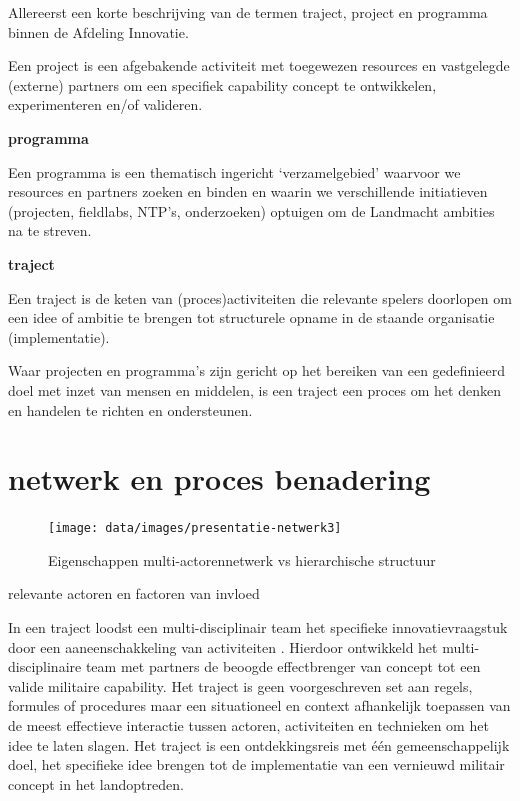 \documentclass[
]{book}
\begin{document}
Allereerst een korte beschrijving van de termen traject, project en programma binnen de Afdeling Innovatie.

Een project is een afgebakende activiteit met toegewezen resources en vastgelegde (externe) partners om een specifiek capability concept te ontwikkelen, experimenteren en/of valideren.

\textbf{programma}

Een programma is een thematisch ingericht `verzamelgebied' waarvoor we resources en partners zoeken en binden en waarin we verschillende initiatieven (projecten, fieldlabs, NTP's, onderzoeken) optuigen om de Landmacht ambities na te streven.

\textbf{traject}

Een traject is de keten van (proces)activiteiten die relevante spelers doorlopen om een idee of ambitie te brengen tot structurele opname in de staande organisatie (implementatie).

Waar projecten en programma's zijn gericht op het bereiken van een gedefinieerd doel met inzet van mensen en middelen, is een traject een proces om het denken en handelen te richten en ondersteunen.

\hypertarget{netwerk-en-proces-benadering}{%
\section{netwerk en proces benadering}\label{netwerk-en-proces-benadering}}

\begin{figure}

{\centering \texttt{[image: data/images/presentatie-netwerk3]} 

}

\caption{Eigenschappen multi-actorennetwerk vs hierarchische structuur}\label{fig:keten}
\end{figure}

relevante actoren en factoren van invloed

In een traject loodst een multi-disciplinair team het specifieke innovatievraagstuk door een aaneenschakkeling van activiteiten . Hierdoor ontwikkeld het multi-disciplinaire team met partners de beoogde effectbrenger van concept tot een valide militaire capability.
Het traject is geen voorgeschreven set aan regels, formules of procedures maar een situationeel en context afhankelijk toepassen van de meest effectieve interactie tussen actoren, activiteiten en technieken om het idee te laten slagen. Het traject is een ontdekkingsreis met één gemeenschappelijk doel, het specifieke idee brengen tot de implementatie van een vernieuwd militair concept in het landoptreden.
\end{document}
